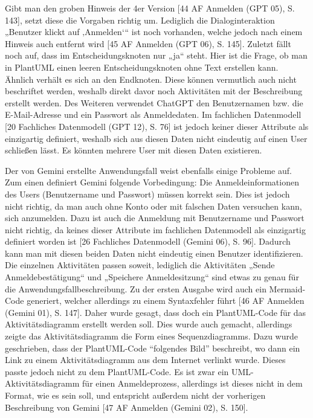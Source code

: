 Gibt man den groben Hinweis der 4er Version [44 AF Anmelden (GPT 05), S. 143], setzt diese die Vorgaben richtig um. Lediglich die 
Dialoginteraktion „Benutzer klickt auf ‚Anmelden‘“ ist noch vorhanden, welche jedoch nach einem Hinweis auch entfernt wird 
[45 AF Anmelden (GPT 06), S. 145]. Zuletzt fällt noch auf, dass im Entscheidungsknoten nur „ja“ steht. Hier ist die Frage, ob man in PlantUML 
einen leeren Entscheidungsknoten ohne Text erstellen kann. Ähnlich verhält es sich an den Endknoten. Diese können vermutlich auch nicht 
beschriftet werden, weshalb direkt davor noch Aktivitäten mit der Beschreibung erstellt werden. Des Weiteren verwendet ChatGPT den Benutzernamen 
bzw. die E-Mail-Adresse und ein Passwort als Anmeldedaten. Im fachlichen Datenmodell [20 Fachliches Datenmodell (GPT 12), S. 76] ist jedoch 
keiner dieser Attribute als einzigartig definiert, weshalb sich aus diesen Daten nicht eindeutig auf einen User schließen lässt. Es könnten 
mehrere User mit diesen Daten existieren.

Der von Gemini erstellte Anwendungsfall weist ebenfalls einige Probleme auf. Zum einen definiert Gemini folgende Vorbedingung: Die 
Anmeldeinformationen des Users (Benutzername und Passwort) müssen korrekt sein. Dies ist jedoch nicht richtig, da man auch ohne Konto 
oder mit falschen Daten versuchen kann, sich anzumelden. Dazu ist auch die Anmeldung mit Benutzername und Passwort nicht richtig, da keines 
dieser Attribute im fachlichen Datenmodell als einzigartig definiert worden ist [26 Fachliches Datenmodell (Gemini 06), S. 96]. Dadurch 
kann man mit diesen beiden Daten nicht eindeutig einen Benutzer identifizieren. Die einzelnen Aktivitäten passen soweit, lediglich die 
Aktivitäten „Sende Anmeldebestätigung“ und „Speichere Anmeldesitzung“ sind etwas zu genau für die Anwendungsfallbeschreibung. Zu der ersten 
Ausgabe wird auch ein Mermaid-Code generiert, welcher allerdings zu einem Syntaxfehler führt [46 AF Anmelden (Gemini 01), S. 147]. Daher 
wurde gesagt, dass doch ein PlantUML-Code für das Aktivitätsdiagramm erstellt werden soll. Dies wurde auch gemacht, allerdings zeigte das 
Aktivitätsdiagramm die Form eines Sequenzdiagramms. Dazu wurde geschrieben, dass der PlantUML-Code ``folgendes Bild'' beschreibt, wo dann ein 
Link zu einem Aktivitätsdiagramm aus dem Internet verlinkt wurde. Dieses passte jedoch nicht zu dem PlantUML-Code. Es ist zwar ein 
UML-Aktivitätsdiagramm für einen Anmeldeprozess, allerdings ist dieses nicht in dem Format, wie es sein soll, und entspricht außerdem nicht 
der vorherigen Beschreibung von Gemini [47 AF Anmelden (Gemini 02), S. 150].

